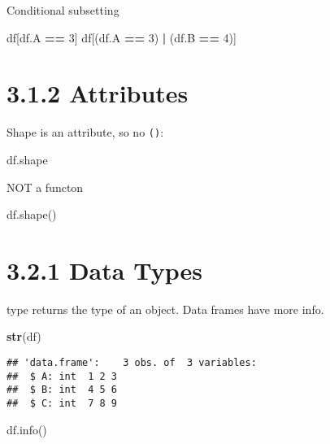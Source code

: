 \documentclass[]{book}
\newenvironment{Shaded}{\begin{snugshade}}{\end{snugshade}}
\newcommand{\DecValTok}[1]{\textcolor[rgb]{0.00,0.00,0.81}{#1}}
\newcommand{\KeywordTok}[1]{\textcolor[rgb]{0.13,0.29,0.53}{\textbf{#1}}}
\newcommand{\NormalTok}[1]{#1}
\newcommand{\OperatorTok}[1]{\textcolor[rgb]{0.81,0.36,0.00}{\textbf{#1}}}
\theoremstyle{definition}
\theoremstyle{definition}
\theoremstyle{definition}
\theoremstyle{remark}
\begin{document}
Conditional subsetting

\begin{Shaded}
\begin{Highlighting}[]
\NormalTok{df[df.A }\OperatorTok{==} \DecValTok{3}\NormalTok{]}
\NormalTok{df[(df.A }\OperatorTok{==} \DecValTok{3}\NormalTok{) }\OperatorTok{|}\NormalTok{ (df.B }\OperatorTok{==} \DecValTok{4}\NormalTok{)]}
\end{Highlighting}
\end{Shaded}

\hypertarget{attributes}{%
\section{3.1.2 Attributes}\label{attributes}}

Shape is an attribute, so no \texttt{()}:

\begin{Shaded}
\begin{Highlighting}[]
\NormalTok{df.shape}
\end{Highlighting}
\end{Shaded}

NOT a functon

\begin{Shaded}
\begin{Highlighting}[]
\NormalTok{df.shape()}
\end{Highlighting}
\end{Shaded}

\hypertarget{data-types-1}{%
\section{3.2.1 Data Types}\label{data-types-1}}

type returns the type of an object. Data frames have more info.

\begin{Shaded}
\begin{Highlighting}[]
\KeywordTok{str}\NormalTok{(df)}
\end{Highlighting}
\end{Shaded}

\begin{verbatim}
## 'data.frame':    3 obs. of  3 variables:
##  $ A: int  1 2 3
##  $ B: int  4 5 6
##  $ C: int  7 8 9
\end{verbatim}

\begin{Shaded}
\begin{Highlighting}[]
\NormalTok{df.info()}
\end{Highlighting}
\end{Shaded}
\end{document}
